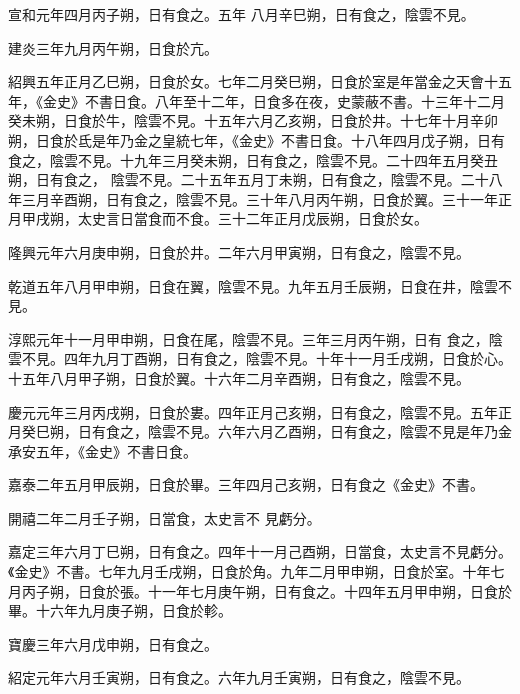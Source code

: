 \begin{pinyinscope}
 宣和元年四月丙子朔，日有食之。五年
 八月辛巳朔，日有食之，陰雲不見。



 建炎三年九月丙午朔，日食於亢。



 紹興五年正月乙巳朔，日食於女。七年二月癸巳朔，日食於室是年當金之天會十五年，《金史》不書日食。八年至十二年，日食多在夜，史蒙蔽不書。十三年十二月癸未朔，日食於牛，陰雲不見。十五年六月乙亥朔，日食於井。十七年十月辛卯朔，日食於氐是年乃金之皇統七年，《金史》不書日食。十八年四月戊子朔，日有食之，陰雲不見。十九年三月癸未朔，日有食之，陰雲不見。二十四年五月癸丑朔，日有食之，
 陰雲不見。二十五年五月丁未朔，日有食之，陰雲不見。二十八年三月辛酉朔，日有食之，陰雲不見。三十年八月丙午朔，日食於翼。三十一年正月甲戌朔，太史言日當食而不食。三十二年正月戊辰朔，日食於女。



 隆興元年六月庚申朔，日食於井。二年六月甲寅朔，日有食之，陰雲不見。



 乾道五年八月甲申朔，日食在翼，陰雲不見。九年五月壬辰朔，日食在井，陰雲不見。



 淳熙元年十一月甲申朔，日食在尾，陰雲不見。三年三月丙午朔，日有
 食之，陰雲不見。四年九月丁酉朔，日有食之，陰雲不見。十年十一月壬戌朔，日食於心。十五年八月甲子朔，日食於翼。十六年二月辛酉朔，日有食之，陰雲不見。



 慶元元年三月丙戌朔，日食於婁。四年正月己亥朔，日有食之，陰雲不見。五年正月癸巳朔，日有食之，陰雲不見。六年六月乙酉朔，日有食之，陰雲不見是年乃金承安五年，《金史》不書日食。



 嘉泰二年五月甲辰朔，日食於畢。三年四月己亥朔，日有食之《金史》不書。



 開禧二年二月壬子朔，日當食，太史言不
 見虧分。



 嘉定三年六月丁巳朔，日有食之。四年十一月己酉朔，日當食，太史言不見虧分。《金史》不書。七年九月壬戌朔，日食於角。九年二月甲申朔，日食於室。十年七月丙子朔，日食於張。十一年七月庚午朔，日有食之。十四年五月甲申朔，日食於畢。十六年九月庚子朔，日食於軫。



 寶慶三年六月戊申朔，日有食之。



 紹定元年六月壬寅朔，日有食之。六年九月壬寅朔，日有食之，陰雲不見。




\end{pinyinscope}
